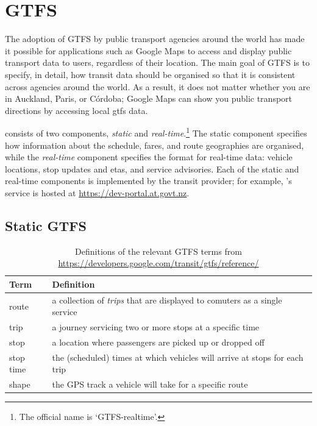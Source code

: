 \section{GTFS}
\label{sec:gtfs}

\glsresetall{}

The adoption of GTFS \citep{GoogleDevelopers_2006} by public transport agencies around the world has made it possible for applications such as Google Maps to access and display public transport data to users, regardless of their location. The main goal of GTFS is to specify, in detail, how transit data should be organised so that it is consistent across agencies around the world. As a result, it does not matter whether you are in Auckland, Paris, or C\'ordoba; Google Maps can show you public transport directions by accessing local \gls{gtfs} data.


\GTFS{} consists of two components, \emph{static} and \emph{real-time}.\footnote{The official name is `GTFS-realtime'.} The static component specifies how information about the schedule, fares, and route geographies are organised, while the \emph{real-time} component specifies the format for real-time data: vehicle locations, stop updates and \glspl{eta}, and service advisories. Each of the static and real-time components is implemented by the transit provider; for example, \AT{}'s \GTFS{} service is hosted at \url{https://dev-portal.at.govt.nz}.


\subsection{Static GTFS}
\label{sec:gtfs_static}


\begin{table}[t]
\centering
\fontsize{10}{12}\selectfont
\begin{tabular}{ll}
\toprule
Term & Definition \\
\midrule
route & a collection of \emph{trips} that are displayed to comuters
as a single service \\
trip & a journey servicing two or more stops at a specific time \\
stop & a location where passengers are picked up or dropped off \\
stop time & the (scheduled) times at which vehicles
will arrive at stops for each trip \\
shape & the GPS track a vehicle will take for a specific route \\
\bottomrule
\end{tabular}
\caption[Definitions of GTFS terms]{Definitions of the relevant GTFS terms from \url{https://developers.google.com/transit/gtfs/reference/}}
\label{tab:gtfs_terms}
\end{table}


